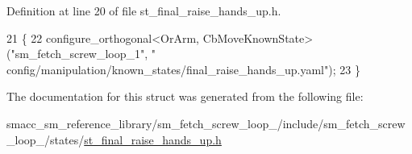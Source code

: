 Definition at line 20 of file st\+\_\+final\+\_\+raise\+\_\+hands\+\_\+up.\+h.


\begin{DoxyCode}
21     \{
22         configure\_orthogonal<OrArm, CbMoveKnownState>(\textcolor{stringliteral}{"sm\_fetch\_screw\_loop\_1"}, \textcolor{stringliteral}{"
      config/manipulation/known\_states/final\_raise\_hands\_up.yaml"});
23     \}
\end{DoxyCode}


The documentation for this struct was generated from the following file\+:\begin{DoxyCompactItemize}
\item 
smacc\+\_\+sm\+\_\+reference\+\_\+library/sm\+\_\+fetch\+\_\+screw\+\_\+loop\+\_/include/sm\+\_\+fetch\+\_\+screw\+\_\+loop\+\_/states/\hyperlink{sm__fetch__screw__loop__1_2include_2sm__fetch__screw__loop__1_2states_2st__final__raise__hands__up_8h}{st\+\_\+final\+\_\+raise\+\_\+hands\+\_\+up.\+h}\end{DoxyCompactItemize}
